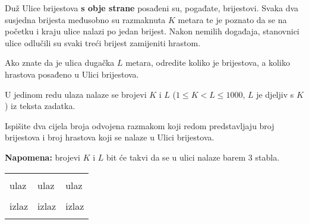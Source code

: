 \renewcommand{\taskname}{STRAVA}
\renewcommand{\timelimit}{1 sekunda}
\renewcommand{\memorylimit}{32 MB}
\renewcommand{\score}{20 bodova}

Duž Ulice brijestova \textbf{s obje strane} posađeni su, pogađate, brijestovi. Svaka dva susjedna brijesta međusobno su razmaknuta $K$ metara te je poznato da se na početku i kraju ulice nalazi po jedan brijest. Nakon nemilih događaja, stanovnici ulice odlučili su svaki treći brijest zamijeniti hrastom. 

Ako znate da je ulica dugačka $L$ metara, odredite koliko je brijestova, a koliko hrastova posađeno u Ulici brijestova. 

\strut


U jedinom redu ulaza nalaze se brojevi $K$ i $L$ ($1 \leqslant K < L \leqslant 1000$, $L$ je djeljiv s $K$) iz teksta zadatka.

\strut


Ispišite dva cijela broja odvojena razmakom koji redom predstavljaju broj brijestova i broj hrastova koji se nalaze u Ulici brijestova.

\textbf{Napomena:} brojevi $K$ i $L$ bit će takvi da se u ulici nalaze barem 3 stabla.

\strut


\begin{center}
\fontfamily{\ttdefault}
\fontsize{10pt}{1em}
\selectfont
\begin{tabu}to 0.99\textwidth{|X[1]|X[1]|X[1]|}
\hline
& & \\ 
\rowfont{\fontsize{10pt}{1em}\bfseries}
ulaz & ulaz & ulaz\\
 &
 & 
 \\
\rowfont{\fontsize{10pt}{1em}\bfseries}
izlaz & izlaz & izlaz\\
 &
 & 
 \\
\hline
\end{tabu}
\end{center}

{
\fontsize{10pt}{1em}
\selectfont
}